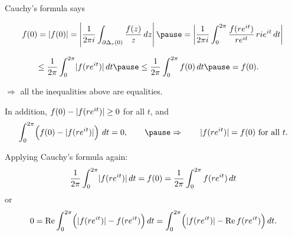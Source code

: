 \documentclass[10pt,aspectratio=169]{beamer}
\begin{document}
\begin{frame}
Cauchy's formula says

\medskip
$\displaystyle
\qquad
f(0) = \sabs{f(0)} =
\abs{\frac{1}{2\pi i}
\int_{\partial \Delta_r(0)}
\frac{f(z)}{z} \, dz
}
\pause
 =
\abs{
\frac{1}{2\pi i}
\int_0^{2\pi}
\frac{f(re^{it})}{re^{it}} \, ri e^{it} \, dt
}
$

\pause
$\displaystyle
\qquad\qquad \leq
\frac{1}{2\pi}
\int_0^{2\pi}
\sabs{f(re^{it})}\, dt
\pause
\leq
\frac{1}{2\pi}
\int_0^{2\pi}
f(0)\, dt \pause = f(0) .
$

\pause
\medskip

$\Rightarrow$ all the inequalities above are equalities.

\medskip
\pause

In addition, $f(0)-\lvert {f(re^{it})} \rvert \geq 0$ for all $t$, and
\[
\int_0^{2\pi}\Bigl( f(0)-\sabs{f(re^{it})} \Bigr) \ dt = 0 ,
\qquad \pause \Rightarrow \qquad \sabs{f(re^{it})} = f(0) \text{ for all } t.
\]

\pause

Applying Cauchy's formula
again:
\begin{equation*}
\frac{1}{2\pi}
\int_0^{2\pi}
\lvert {f(re^{it})} \rvert\, dt
=
f(0)
=
\frac{1}{2\pi}
\int_0^{2\pi}
f(re^{it})\, dt
\end{equation*}
\pause
or
\begin{equation*}
0 =
\operatorname{Re} \int_0^{2\pi}
\Bigl(\lvert {f(re^{it})} \rvert-f(re^{it})\Bigr)\, dt
=
\int_0^{2\pi}
\Bigl(\lvert {f(re^{it})} \rvert-\operatorname{Re} f(re^{it})\Bigr)\, dt .
\end{equation*}

\end{frame}
\end{document}
